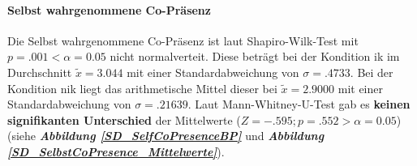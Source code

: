 \documentclass[a4paper,11pt]{article}%
\renewcommand{\\}{\vspace*{0.5\baselineskip} \newline}
\begin{document}
\paragraph{Selbst wahrgenommene Co-Präsenz}
Die Selbst wahrgenommene Co-Präsenz ist laut Shapiro-Wilk-Test mit $p = .001 < \alpha = 0.05$ nicht normalverteit.
Diese beträgt bei der Kondition \ac{ik} im Durchschnitt $\tilde x = 3.044$ mit einer Standardabweichung von $\sigma = .4733$.\newline 
Bei der Kondition \ac{nik} liegt das arithmetische Mittel dieser bei $\tilde x = 2.9000$ mit einer Standardabweichung von $\sigma = .21639$. 
Laut Mann-Whitney-U-Test gab es \textbf{keinen signifikanten Unterschied} der Mittelwerte ($ Z = -.595; p = .552 > \alpha = 0.05$) (siehe \textbf{\textit{Abbildung \ref{SD_SelfCoPresenceBP}}} und \textbf{\textit{Abbildung \ref{SD_SelbstCoPresence_Mittelwerte}}}).
	
\end{document}
